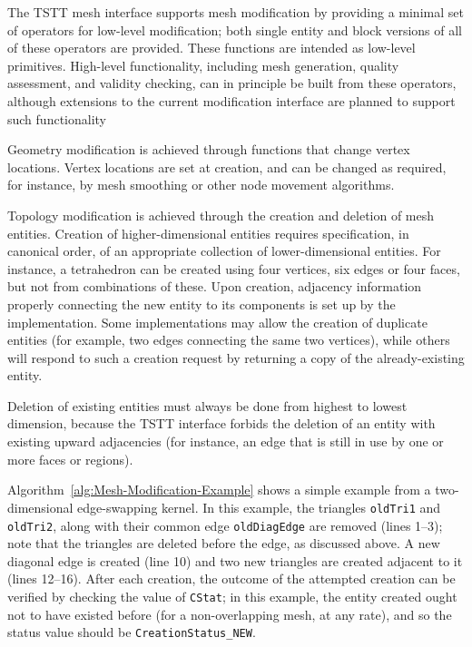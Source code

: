 The TSTT mesh interface supports mesh modification by providing a
minimal set of operators for low-level modification; both single entity
and block versions of all of these operators are provided.  These
functions are intended as low-level primitives.  High-level
functionality, including mesh generation, quality assessment, and
validity checking, can in principle be built from these operators,
although extensions to the current modification interface are planned to
support such functionality

Geometry modification is achieved through functions that change vertex
locations.  Vertex locations are set at creation, and can be changed as
required, for instance, by mesh smoothing or other node movement
algorithms.

Topology modification is achieved through the creation and deletion of
mesh entities.  Creation of higher-dimensional entities requires
specification, in canonical order, of an appropriate collection of
lower-dimensional entities. For instance, a tetrahedron can be created
using four vertices, six edges or four faces, but not from
combinations of these. Upon creation, adjacency information properly
connecting the new entity to its components is set up by the
implementation. Some implementations may allow the creation of
duplicate entities (for example, two edges connecting the same two
vertices), while others will respond to such a creation request by
returning a copy of the already-existing entity.

Deletion of existing entities must always be done from highest to
lowest dimension, because the TSTT interface forbids the deletion
of an entity with existing upward adjacencies (for instance, an edge
that is still in use by one or more faces or regions).

Algorithm~\ref{alg:Mesh-Modification-Example} shows a simple example
from a two-dimensional edge-swapping kernel. In this example, the
triangles \texttt{oldTri1} and \texttt{oldTri2}, along with their common
edge \texttt{oldDiagEdge} are removed (lines 1--3); note that the
triangles are deleted before the edge, as discussed above. A new
diagonal edge is created (line 10) and two new triangles are created
adjacent to it (lines 12--16). After each creation, the outcome of the
attempted creation can be verified by checking the value of
\texttt{CStat}; in this example, the entity created ought not to have
existed before (for a non-overlapping mesh, at any rate), and so the
status value should be \texttt{CreationStatus\_NEW}.


